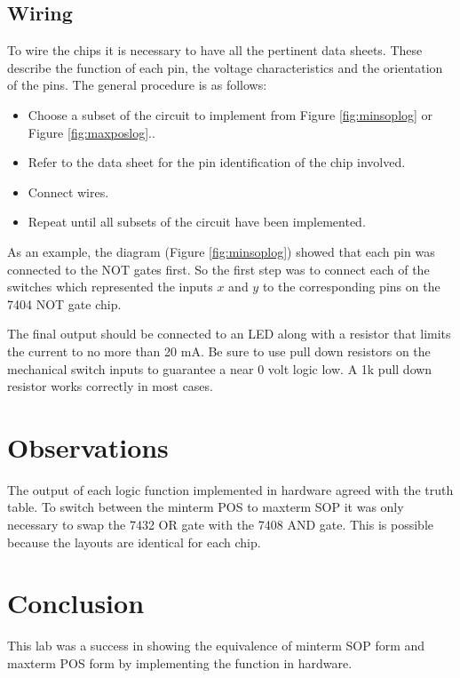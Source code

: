 \documentclass[12pt]{article}
\begin{document}
\clearpage

\subsection{Wiring}

To wire the chips it is necessary to have all the pertinent data sheets.
These describe the function of each pin, the voltage characteristics and
the orientation of the pins.
The general procedure is as follows:
\begin{itemize}
	\item Choose a subset of the circuit to implement from Figure \ref{fig:minsoplog} or Figure \ref{fig:maxposlog}..
	\item Refer to the data sheet for the pin identification of the chip involved.
	\item Connect wires.
	\item Repeat until all subsets of the circuit have been implemented.
\end{itemize}

As an example, the diagram (Figure \ref{fig:minsoplog}) showed that
each pin was connected to the NOT gates first.
So the first step was to connect each of the switches which represented
the inputs $x$ and $y$ to the corresponding pins on the 7404 NOT gate chip.

The final output should be connected to an LED along with a resistor
that limits the current to no more than 20 mA.
Be sure to use pull down resistors on the mechanical switch inputs to
guarantee a near 0 volt logic low.
A 1k pull down resistor works correctly in most cases.


\section{Observations}

The output of each logic function implemented in hardware agreed
with the truth table.
To switch between the minterm POS to maxterm SOP it was only
necessary to swap the 7432 OR gate with the 7408 AND gate.
This is possible because the layouts are identical for each chip.

\clearpage
\section{Conclusion}

This lab was a success in showing the equivalence of minterm SOP
form and maxterm POS form by implementing the function in hardware.


%
%
%
%

\end{document}
